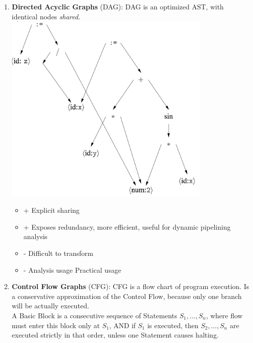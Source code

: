 \documentclass[a4paper]{article}
\theoremstyle{definition}
\begin{document}
\begin{enumerate}
\begin{enumerate}
    \item \textbf{Directed Acyclic Graphs} (DAG): DAG is an optimized AST, with identical nodes \textit{shared}.\\
    \includegraphics[width=10cm]{img/Snipaste_2021-04-19_07-11-03.png}
    \begin{itemize}
      \item + Explicit sharing
      \item + Exposes redundancy, more efficient, useful for dynamic pipelining analysis
      \item - Difficult to transform
      \item - Analysis usage Practical usage
    \end{itemize}
    \item \textbf{Control Flow Graphs} (CFG): CFG is a flow chart of program execution. Is a conservative approximation of the Control Flow, because only one branch will be actually executed.\\
    A Basic Block is a consecutive sequence of Statements $S_{1}, \ldots, S_{n}$, where flow must enter this block only at $S_{1}$, AND if $S_{1}$ is executed, then $S_{2}, \ldots, S_{n}$ are executed strictly in that order, unless one Statement causes halting.


\end{enumerate}
\end{enumerate}
\end{document}
